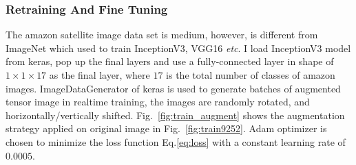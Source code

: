\documentclass[11pt,oneside,a4paper]{article}
\begin{document}
\subsubsection{Retraining And Fine Tuning}
The amazon satellite image data set is medium, however, is different from ImageNet which used to train InceptionV3, VGG16 \emph{etc}. I load InceptionV3 model from keras, pop up the final layers and use a fully-connected layer in shape of $1\times1\times17$ as the final layer, where $17$ is the total number of classes of amazon images. ImageDataGenerator of keras is used to generate batches of augmented tensor image in realtime training, the images are randomly rotated, and horizontally/vertically shifted. Fig.~\ref{fig:train_augment} shows the augmentation strategy applied on original image in Fig.~\ref{fig:train9252}. Adam optimizer\cite{adam} is chosen to minimize the loss function Eq.\ref{eq:loss} with a constant learning rate of $0.0005$.
\end{document}

